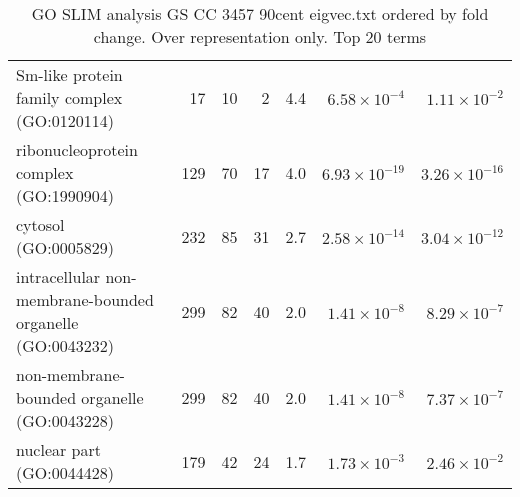 \begin{table}[ht]
\begin{adjustbox}{width=\textwidth}
\begin{tabular}{lrrrrrr}
  Sm-like protein family complex (GO:0120114) & 17 & 10 & 2 & 4.4 & $6.58 \times 10^{-4}$ & $1.11 \times 10^{-2}$ \\ 
  ribonucleoprotein complex (GO:1990904) & 129 & 70 & 17 & 4.0 & $6.93 \times 10^{-19}$ & $3.26 \times 10^{-16}$ \\ 
  cytosol (GO:0005829) & 232 & 85 & 31 & 2.7 & $2.58 \times 10^{-14}$ & $3.04 \times 10^{-12}$ \\ 
  intracellular non-membrane-bounded organelle (GO:0043232) & 299 & 82 & 40 & 2.0 & $1.41 \times 10^{-8}$ & $8.29 \times 10^{-7}$ \\ 
  non-membrane-bounded organelle (GO:0043228) & 299 & 82 & 40 & 2.0 & $1.41 \times 10^{-8}$ & $7.37 \times 10^{-7}$ \\ 
  nuclear part (GO:0044428) & 179 & 42 & 24 & 1.7 & $1.73 \times 10^{-3}$ & $2.46 \times 10^{-2}$ \\ 
   \hline
\end{tabular}
\end{adjustbox}
\caption{GO SLIM analysis GS CC 3457 90cent eigvec.txt ordered by fold change. Over representation only. Top 20 terms} 
\label{tab:GO SLIM analysis GS CC 3457 90cent eigvec.txt ordered by fold change. Over representation only. Top 20 terms}
\end{table}




